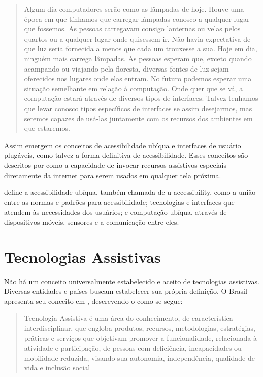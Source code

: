 \documentclass[english,brazilian]{UNISINOSmonografia}
\begin{document}
\begin{quote}
	Algum dia computadores serão como as lâmpadas de hoje. Houve uma época em que tínhamos que carregar lâmpadas conosco a qualquer lugar que fossemos. As pessoas carregavam consigo lanternas ou velas pelos quartos ou a qualquer lugar onde quisessem ir. Não havia expectativa de que luz seria fornecida a menos que cada um trouxesse a sua. Hoje em dia, ninguém mais carrega lâmpadas. As pessoas esperam que, exceto quando acampando ou viajando pela floresta, diversas fontes de luz sejam oferecidos nos lugares onde elas entram. No futuro podemos esperar uma situação semelhante em relação à computação. Onde quer que se vá, a computação estará através de diversos tipos de interfaces. Talvez tenhamos que levar conosco tipos específicos de interfaces se assim desejarmos, mas seremos capazes de usá-las juntamente com os recursos dos ambientes em que estaremos. \cite{vanderheiden2008ubiquitous}
\end{quote}

Assim emergem os conceitos de acessibilidade ubíqua e interfaces de usuário plugáveis, como talvez a forma definitiva de acessibilidade. Esses conceitos são descritos por  como a capacidade de invocar recursos assistivos especiais diretamente da internet para serem usados em qualquer tela próxima.

 define a acessibilidade ubíqua, também chamada de u-accessibility, como a união entre as normas e padrões para acessibilidade; tecnologias e interfaces que atendem às necessidades dos usuários; e computação ubíqua, através de dispositivos móveis, sensores e a comunicação entre eles.

	\section{Tecnologias Assistivas} 
Não há um conceito universalmente estabelecido e aceito de tecnologias assistivas. Diversas entidades e países buscam estabelecer sua própria definição. O Brasil apresenta seu conceito em \cite{TA2009}, descrevendo-o como se segue:
\begin{quote}
	Tecnologia Assistiva é uma área do conhecimento, de característica interdisciplinar, que
	engloba produtos, recursos, metodologias, estratégias, práticas e serviços que objetivam promover
	a funcionalidade, relacionada à atividade e participação, de pessoas com deficiência,
	incapacidades ou mobilidade reduzida, visando sua autonomia, independência, qualidade de vida e
	inclusão social
\end{quote}
\end{document}
